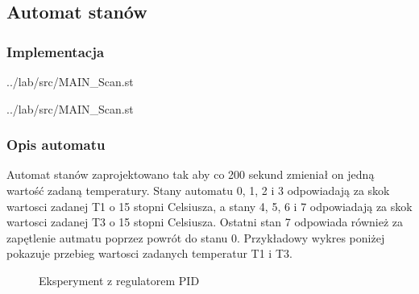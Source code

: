 \subsection{Automat stanów}
\label{lab:zad6}


\subsubsection{Implementacja}

\lstset{style=customc}
\ifdefined\CompileListings
    
        {../lab/src/MAIN_Scan.st}
    \newpage
\fi

\lstset{style=customc}
\ifdefined\CompileListings
    
        {../lab/src/MAIN_Scan.st}
\fi

\subsubsection{Opis automatu}

Automat stanów zaprojektowano tak aby co 200 sekund zmieniał on jedną wartość zadaną
temperatury.
\newline
Stany automatu 0, 1, 2 i 3 odpowiadają za skok wartosci zadanej T1 o 15 stopni Celsiusza, 
a stany 4, 5, 6 i 7 odpowiadają za skok wartosci zadanej T3 o 15 stopni Celsiusza.
\newline
Ostatni stan 7 odpowiada również za zapętlenie autmatu poprzez powrót do stanu 0.
\newline
Przykładowy wykres poniżej pokazuje przebieg wartosci zadanych temperatur T1 i T3.

\begin{figure}[H] 
    \centering
    
    \caption{Eksperyment z regulatorem PID}
    \label{lab:zad3:figure:regulatorPID}
 \end{figure}
\newpage
